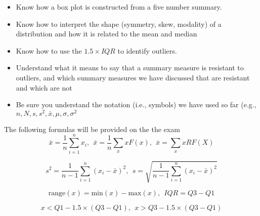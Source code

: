 \documentclass[18pt]{article}
\begin{document}
\begin{itemize}
		\item Know how a box plot is constructed from a five number summary.
		
		\item Know how to interpret the shape (symmetry, skew, modality) of a distribution and how it is related to the mean and median
		
		\item Know how to use the $1.5\times IQR$ to identify outliers.
		
		\item Understand what it means to say that a summary measure is resistant to outliers, and which summary measures we have discussed that are resistant and which are not
		
		\item Be sure you understand the notation (i.e., symbols) we have used so far (e.g., $n,N,s,s^2,\bar{x}, \mu,\sigma,\sigma^2$
		
	\end{itemize}
	
	The following formulas will be provided on the the exam
	\[\bar{x} = \frac{1}{n} \sum_{i=1}^n x_i, \ \ \bar{x} = \frac{1}{n}\sum_{x} xF(x), \ \  \bar{x} = \sum_{x} xRF(X)\]
	
	\[s^2 = \frac{1}{n-1}\sum_{i=1}^n (x_i - \bar{x})^2, \ \ s = \sqrt{\frac{1}{n-1}\sum_{i=1}^n (x_i - \bar{x})^2}\]
		
	\[ \text{range}(x) = \text{min}(x) - \text{max}(x), \ \ IQR = Q3 - Q1 \]
	
	\[x < Q1 - 1.5 \times (Q3 - Q1), \ \  x > Q3 - 1.5\times(Q3-Q1)\]
\end{document}
